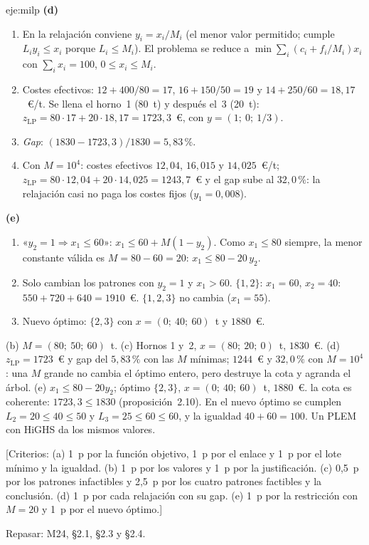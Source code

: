 \begin{solucion}{eje:milp}
\noindent\textbf{(d)}
\begin{enumerate}[label=\arabic*.]
  \item En la relajación conviene $y_i=x_i/M_i$ (el menor valor permitido; cumple $L_iy_i\le x_i$ porque $L_i\le M_i$). El problema se reduce a $\min\sum_i(c_i+f_i/M_i)x_i$ con $\sum_ix_i=100$, $0\le x_i\le M_i$.
  \item Costes efectivos: $12+400/80=17$, $16+150/50=19$ y $14+250/60=18{,}17$~€/t. Se llena el horno~1 (80~t) y después el~3 (20~t): $z_{\mathrm{LP}}=80\cdot 17+20\cdot 18{,}17=1723{,}3$~€, con $y=(1;\ 0;\ 1/3)$.
  \item \emph{Gap}: $(1830-1723{,}3)/1830=5{,}83\,\%$.
  \item Con $M=10^{4}$: costes efectivos $12{,}04$, $16{,}015$ y $14{,}025$~€/t; $z_{\mathrm{LP}}=80\cdot 12{,}04+20\cdot 14{,}025=1243{,}7$~€ y el gap sube al $32{,}0\,\%$: la relajación casi no paga los costes fijos ($y_1=0{,}008$).
\end{enumerate}

\noindent\textbf{(e)}
\begin{enumerate}[label=\arabic*.]
  \item «$y_2=1\Rightarrow x_1\le 60$»: $x_1\le 60+M(1-y_2)$. Como $x_1\le 80$ siempre, la menor constante válida es $M=80-60=20$: $x_1\le 80-20\,y_2$.
  \item Solo cambian los patrones con $y_2=1$ y $x_1>60$. $\{1,2\}$: $x_1=60$, $x_2=40$: $550+720+640=1910$~€. $\{1,2,3\}$ no cambia ($x_1=55$).
  \item Nuevo óptimo: $\{2,3\}$ con $x=(0;\ 40;\ 60)$~t y $1880$~€.
\end{enumerate}
\resultado (b) $M=(80;\ 50;\ 60)$~t. (c) Hornos 1 y~2, $x=(80;\ 20;\ 0)$~t, $1830$~€. (d) $z_{\mathrm{LP}}=1723$~€ y gap del $5{,}83\,\%$ con las $M$ mínimas; $1244$~€ y $32{,}0\,\%$ con $M=10^{4}$: una $M$ grande no cambia el óptimo entero, pero destruye la cota y agranda el árbol. (e) $x_1\le 80-20y_2$; óptimo $\{2,3\}$, $x=(0;\ 40;\ 60)$~t, $1880$~€.
\comprobacion la cota es coherente: $1723{,}3\le 1830$ (proposición~2.10). En el nuevo óptimo se cumplen $L_2=20\le 40\le 50$ y $L_3=25\le 60\le 60$, y la igualdad $40+60=100$. Un PLEM con HiGHS da los mismos valores.

[Criterios: (a) 1~p por la función objetivo, 1~p por el enlace y 1~p por el lote mínimo y la igualdad. (b) 1~p por los valores y 1~p por la justificación. (c) 0{,}5~p por los patrones infactibles y 2{,}5~p por los cuatro patrones factibles y la conclusión. (d) 1~p por cada relajación con su gap. (e) 1~p por la restricción con $M=20$ y 1~p por el nuevo óptimo.]

Repasar: M24, §2.1, §2.3 y §2.4.
\end{solucion}

